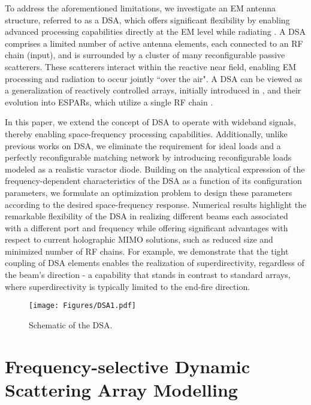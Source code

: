\documentclass[10pt, final, twocolumn, twoside, romanappendices]{IEEEtran}
\begin{document}
To address the aforementioned limitations, we investigate an \ac{EM} antenna structure, referred to as a \acf{DSA}, which offers significant flexibility by enabling advanced processing capabilities directly at the \ac{EM} level while radiating \cite{Dar:C24}. A \ac{DSA} comprises a limited number of active antenna elements, each connected to an \ac{RF} chain (input), and is surrounded by a cluster of many reconfigurable passive scatterers. These scatterers interact within the reactive near field, enabling \ac{EM} processing and radiation to occur jointly ``over the air".
A \ac{DSA} can be viewed as a generalization of reactively controlled arrays, initially introduced in \cite{Har:78}, and their evolution into \acp{ESPAR}, which utilize a single \ac{RF} chain \cite{BucJuaKamSib:20}.


In this paper, we extend the concept of \ac{DSA} to operate with wideband signals, thereby enabling space-frequency processing capabilities. Additionally, unlike previous works on \ac{DSA}, we eliminate the requirement for ideal loads and a perfectly reconfigurable matching network by introducing reconfigurable loads modeled as a realistic varactor diode. 
Building on the analytical expression of the frequency-dependent characteristics of the \ac{DSA} as a function of its configuration parameters, we formulate an optimization problem to design these parameters according to the desired space-frequency response.
%
Numerical results highlight the remarkable flexibility of the \ac{DSA} in realizing different beams each associated with a different port and frequency while offering significant advantages with respect to current holographic \ac{MIMO} solutions, such as reduced size and minimized number of \ac{RF} chains. For example, we demonstrate that the tight coupling of \ac{DSA} elements enables the realization of superdirectivity, regardless of the beam's direction - a capability that stands in contrast to standard arrays, where superdirectivity is typically limited to the end-fire direction.


\begin{figure}[t]
  \centering
  \texttt{[image: Figures/DSA1.pdf]}
  \caption{Schematic of the DSA.}
  \label{Fig:DSA}
\end{figure}


\section{Frequency-selective Dynamic Scattering Array Modelling}
\end{document}
